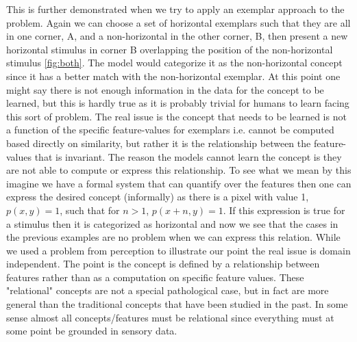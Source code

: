 \documentclass[doc]{apa}%
\begin{document}
This is further demonstrated when we try to apply an exemplar approach
to the problem.  Again we can choose a set of horizontal exemplars
such that they are all in one corner, A, and a non-horizontal in the
other corner, B, then present a new horizontal stimulus in corner B
overlapping the position of the non-horizontal stimulus \ref{fig:both}.
The model would categorize it as the non-horizontal concept since it has a better match with the non-horizontal exemplar.  
At this point one might say there is not enough information in the data for the
concept to be learned, but this is hardly true as it is probably
trivial for humans to learn facing this sort of problem.  The real
issue is the concept that needs to be learned is not a function of the
specific feature-values for exemplars i.e. cannot be computed based
directly on similarity, but rather it is the relationship between the
feature-values that is invariant.   The reason the models cannot learn
the concept is they are not able to compute or express this
relationship.  To see what we mean by this imagine we have a formal
system that can quantify over the features then one can express the
desired concept (informally) as there is a pixel with value 1, $p(x,y)=1$, such that
for $n>1$, $p(x+n,y)=1$.  If this expression is true for a stimulus then it
is categorized as horizontal and now we see that the cases in the
previous examples are no problem when we can express this relation.
While we used a problem from perception to illustrate our point the
real issue is domain independent.  The point is the concept is defined
by a relationship between features rather than as a computation on
specific feature values.  These "relational" concepts are not a
special pathological case, but in fact are more general than the
traditional concepts that have been studied in the past.  In some
sense almost all concepts/features must be relational since everything
must at some point be grounded in sensory data.    
\end{document}
